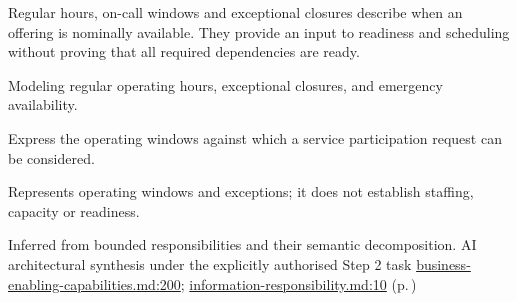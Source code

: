 Regular hours, on-call windows and exceptional closures describe when an offering is nominally available. They provide an input to readiness and scheduling without proving that all required dependencies are ready.



Modeling regular operating hours, exceptional closures, and emergency availability.



Express the operating windows against which a service participation request can be considered.



Represents operating windows and exceptions; it does not establish staffing, capacity or readiness.


Inferred from bounded responsibilities and their semantic decomposition. AI architectural synthesis under the explicitly authorised Step 2 task \hyperref[evidence:e01893359d483acf]{business-enabling-capabilities.md:200}; \hyperref[evidence:be61392fefb4bb10]{information-responsibility.md:10}
 (p.\,\pageref{cap:bec-healthcare-service-definition})
